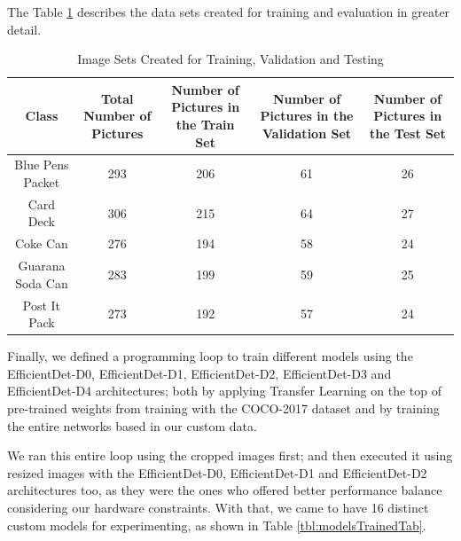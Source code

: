 \documentclass[openright]{normas-utf-tex} %
\begin{document}
The Table \ref{tbl:imageSetsTab} describes the data sets created for training and evaluation in greater detail.

\begin{table}[H]
	\centering
	\begin{adjustbox}{width=1\textwidth}
	\label{tab:imageSets}
	\begin{tabular}{c|c|c|c|c}
		\hline 
		Class & Total Number of Pictures & Number of Pictures in the Train Set & Number of Pictures in the Validation Set & Number of Pictures in the Test Set \\
		\hline
        Blue Pens Packet & 293 & 206 & 61 & 26\\
		Card Deck & 306 & 215 & 64 & 27\\
		Coke Can & 276 & 194 & 58 & 24\\
		Guarana Soda Can & 283 & 199 & 59 & 25\\
		Post It Pack & 273 & 192 & 57 & 24\\
		\hline 
	\end{tabular}
	\end{adjustbox}
	\caption[Image Sets Created for Training, Validation and Testing]{Image Sets Created for Training, Validation and Testing}
	\label{tbl:imageSetsTab}
\end{table}

Finally, we defined a programming loop to train different models using the EfficientDet-D0,
EfficientDet-D1, EfficientDet-D2, EfficientDet-D3 and EfficientDet-D4 architectures; both by
applying Transfer Learning on the top of pre-trained weights from training with the COCO-2017 dataset 
and by training the entire networks based in our custom data. 

We ran this entire loop using the cropped images first; and then executed it using resized images with the EfficientDet-D0,
EfficientDet-D1 and EfficientDet-D2 architectures too, as they were the ones who offered better
performance balance considering our hardware constraints. 
With that, we came to have 16 distinct custom models for experimenting, as shown in Table \ref{tbl:modelsTrainedTab}.
\end{document}
